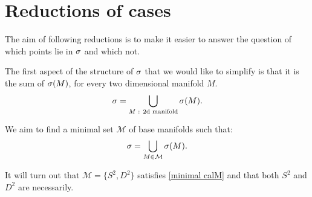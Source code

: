 


\section{Reductions of cases}
The aim of following reductions is to make it easier to answer the question of which 
points lie in ${\sigma}$ and which not. 

The first aspect of the structure of ${\sigma}$ that we would like to simplify is that it is 
the sum of ${{\sigma}(M)}$, for 
every two dimensional manifold $M$. 
\begin{equation}
{\sigma} = \bigcup_{M\textrm{ : 2d manifold}} {{\sigma}(M)}.
\end{equation}


We aim to find a minimal set $\mathcal{M}$ of base manifolds 
such that:
\begin{equation}\label{minimal calM}
{\sigma} = \bigcup_{M\in\mathcal{M}}{{\sigma}(M)}.
\end{equation}

It will turn out that $\mathcal{M} = \{S^2, D^2\}$ satisfies \ref{minimal calM} and 
that both $S^2$ and $D^2$ are necessarily. 


